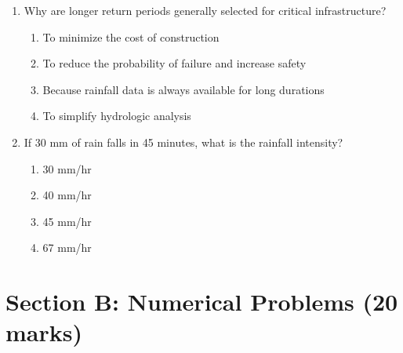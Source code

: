 \documentclass[11pt,a4paper]{article}
\begin{document}
\begin{enumerate}
\item Why are longer return periods generally selected for critical infrastructure?  
\begin{enumerate}[label=\Alph*)]
    \item To minimize the cost of construction  
    \item To reduce the probability of failure and increase safety  
    \item Because rainfall data is always available for long durations  
    \item To simplify hydrologic analysis  
\end{enumerate}

\item If 30 mm of rain falls in 45 minutes, what is the rainfall intensity?
\begin{enumerate}[label=\Alph*)]
    \item 30 mm/hr
    \item 40 mm/hr
    \item 45 mm/hr
    \item 67 mm/hr
\end{enumerate}

\end{enumerate}

\newpage

\section*{Section B: Numerical Problems (20 marks)}
\end{document}
